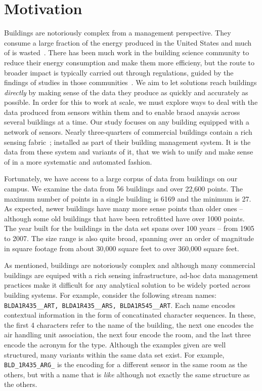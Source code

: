 \section{Motivation}

Buildings are notoriously complex from a management perspective.  They consume a large fraction
of the energy produced in the United States and much of is wasted~\cite{epa}.  There has been
much work in the building science community to reduce their energy consumption and make them more
efficieny, but the route to broader impact is typically carried out through regulations, guided
by the findings of studies in those communities~\cite{regulation}.
We aim to let solutions reach buildings \emph{directly} by making sense of the data they produce
as quickly and accurately as possible.
In order for this to work at scale, we must explore ways to deal with the data produced
from sensors within them and to enable braod anaysis across several buildings at a time. Our study
focuses on any building equipped with a network of sensors.  Nearly 
three-quarters of commercial buildings contain a rich sensing fabric~\cite{study}; installed as part
of their building management system.  It is the data from these system and variants of it, that
we wish to unify and make sense of in a more systematic and automated fashion.

Fortunately, we have access to a large corpus of data from buildings on our campus.
We examine the data from 56 buildings and over 22,600 points.  The maximum number of points in a 
single building is 6169 and the minimum is 27.  As expected, newer buildings have many more sense 
points than older ones -- although some old buildings that have been retrofitted have over 1000  
points. The year built for the buildings in the data set spans over 100 years -- from 1905 to 2007.
The size range is also quite broad, spanning over an order of magnitude in square footage from
about 30,000 square feet to over 360,000 square feet.

%
As mentioned, buildings are notoriously complex and although many commercial 
buildings are equiped with a rich sensing infrastructure, ad-hoc data management practices
make it difficult for any analytical solution to be widely ported across building
systems.  For example, consider the following stream names: \texttt{BLDA1R435\_\_ART,
BLDA1R435\_\_ARS, BLDA1R545\_\_ART}. Each name encodes contextual information in the form
of concatinated character sequences. In these, the first 4 characters refer to the 
name of the building, the next one encodes the air handling unit association, the next 
four encode the room,
and the last three encode the acronym for the type.  Although the examples given are well
structured, many variants within the same data set exist.  For example, \texttt{BLD\_1R435\_ARG\_}
is the encoding for a different sensor in the same room as the others, but with a name
that is \emph{like} although not exactly the same structure as the others.

